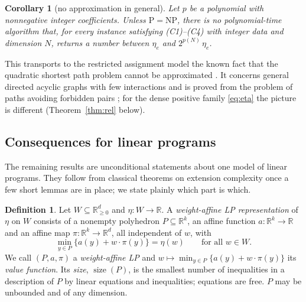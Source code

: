 \documentclass[11pt]{amsart}
\theoremstyle{plain}
\newtheorem{corollary}[theorem]{Corollary}
\theoremstyle{definition}
\newtheorem{definition}[theorem]{Definition}
\theoremstyle{remark}
\newcommand{\R}{\mathbb{R}}
\newcommand{\size}{\operatorname{size}}
\begin{document}
\begin{corollary}[no approximation in general]\label{cor:inapx}
Let $p$ be a polynomial with nonnegative integer coefficients. Unless $\mathrm{P}=\mathrm{NP}$, there is no
polynomial-time algorithm that, for every
instance satisfying \textup{(C1)--(C4)} with integer data and dimension $N$, returns a number between $\eta_e$ and
$2^{p(N)}\,\eta_e$.
\end{corollary}

This transports to the restricted assignment model the known fact that the quadratic shortest path problem cannot
be approximated \cite{Rostami}. It concerns general directed acyclic graphs with few interactions and is proved
from the problem of paths avoiding forbidden pairs \cite{GMO}; for the dense positive family \eqref{eq:eta} the
picture is different (Theorem~\ref{thm:rel} below).

\subsection*{Consequences for linear programs}
The remaining results are unconditional statements about one model of linear programs. They follow from classical
theorems on extension complexity once a few short lemmas are in place; we state plainly which part is which.

\begin{definition}\label{def:lp}
Let $W\subseteq\R^d_{\ge0}$ and $\eta:W\to\R$. A \emph{weight-affine LP representation} of $\eta$ on $W$ consists of a
nonempty polyhedron $P\subseteq\R^k$, an affine function $a:\R^k\to\R$ and an affine map $\pi:\R^k\to\R^d$, all
independent of $w$, with
\[
 \min_{y\in P}\{a(y)+w\cdot\pi(y)\}=\eta(w)\qquad\text{for all }w\in W .
\]
We call $(P,a,\pi)$ a \emph{weight-affine LP} and $w\mapsto\min_{y\in P}\{a(y)+w\cdot\pi(y)\}$ its \emph{value
function}. Its \emph{size}, $\size(P)$, is the smallest number of inequalities in a description of $P$ by linear
equations and inequalities; equations are free. $P$ may be unbounded and of any dimension.
\end{definition}
\end{document}
